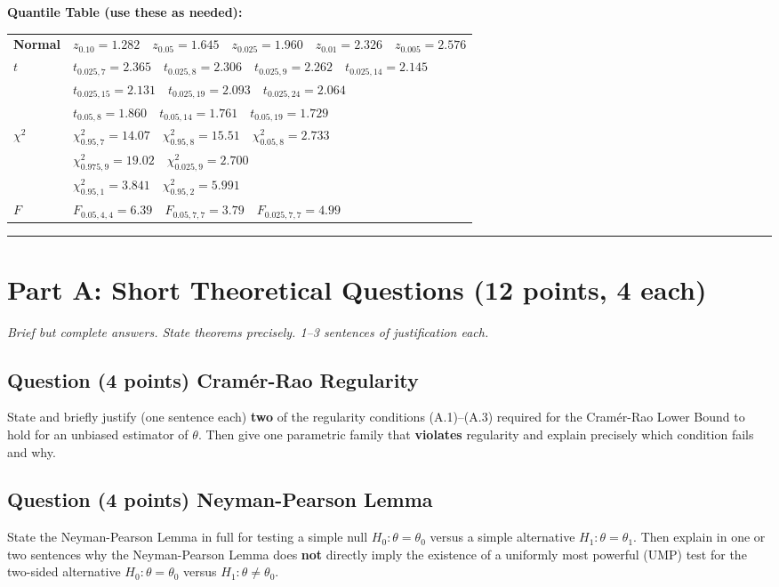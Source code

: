\documentclass[11pt]{article}
\newcounter{qnum}
\newcommand{\question}[2]{\stepcounter{qnum}\subsection*{Question \theqnum \quad (#1 points) \hfill #2}}
\begin{document}
\textbf{Quantile Table (use these as needed):}
\begin{center}\small
\begin{tabular}{ll}
\toprule
\textbf{Normal} & $z_{0.10}=1.282 \quad z_{0.05}=1.645 \quad z_{0.025}=1.960 \quad z_{0.01}=2.326 \quad z_{0.005}=2.576$ \\
\textbf{$t$} & $t_{0.025,7}=2.365 \quad t_{0.025,8}=2.306 \quad t_{0.025,9}=2.262 \quad t_{0.025,14}=2.145$ \\
            & $t_{0.025,15}=2.131 \quad t_{0.025,19}=2.093 \quad t_{0.025,24}=2.064$ \\
            & $t_{0.05,8}=1.860 \quad t_{0.05,14}=1.761 \quad t_{0.05,19}=1.729$ \\
\textbf{$\chi^2$} & $\chi^2_{0.95,7}=14.07 \quad \chi^2_{0.95,8}=15.51 \quad \chi^2_{0.05,8}=2.733$ \\
                  & $\chi^2_{0.975,9}=19.02 \quad \chi^2_{0.025,9}=2.700$ \\
                  & $\chi^2_{0.95,1}=3.841 \quad \chi^2_{0.95,2}=5.991$ \\
\textbf{$F$} & $F_{0.05,4,4}=6.39 \quad F_{0.05,7,7}=3.79 \quad F_{0.025,7,7}=4.99$ \\
\bottomrule
\end{tabular}
\end{center}

\bigskip
\hrule
\bigskip

\section*{Part A: Short Theoretical Questions \hfill (12 points, 4 each)}

\textit{Brief but complete answers. State theorems precisely. 1--3 sentences of justification each.}

\question{4}{Cram\'er-Rao Regularity}
State and briefly justify (one sentence each) \textbf{two} of the regularity conditions (A.1)--(A.3) required for the Cram\'er-Rao Lower Bound to hold for an unbiased estimator of $\theta$. Then give one parametric family that \textbf{violates} regularity and explain precisely which condition fails and why.

\question{4}{Neyman-Pearson Lemma}
State the Neyman-Pearson Lemma in full for testing a simple null $H_0: \theta = \theta_0$ versus a simple alternative $H_1: \theta = \theta_1$. Then explain in one or two sentences why the Neyman-Pearson Lemma does \textbf{not} directly imply the existence of a uniformly most powerful (UMP) test for the two-sided alternative $H_0: \theta = \theta_0$ versus $H_1: \theta \neq \theta_0$.
\end{document}
